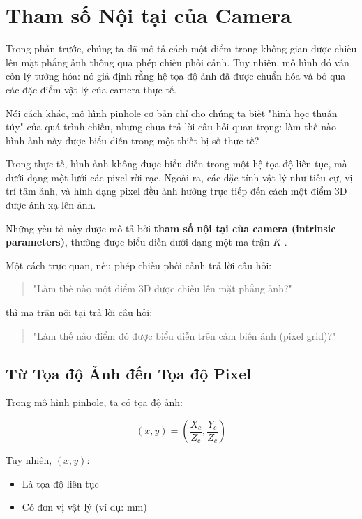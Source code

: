 \section{Tham số Nội tại của Camera}
\label{sec:intrinsic_parameters}

Trong phần trước, chúng ta đã mô tả cách một điểm trong không gian được chiếu lên mặt phẳng ảnh thông qua phép chiếu phối cảnh. Tuy nhiên, mô hình đó vẫn còn lý tưởng hóa: nó giả định rằng hệ tọa độ ảnh đã được chuẩn hóa và bỏ qua các đặc điểm vật lý của camera thực tế.

Nói cách khác, mô hình pinhole cơ bản chỉ cho chúng ta biết "hình học thuần túy" của quá trình chiếu, nhưng chưa trả lời câu hỏi quan trọng: làm thế nào hình ảnh này được biểu diễn trong một thiết bị số thực tế?

Trong thực tế, hình ảnh không được biểu diễn trong một hệ tọa độ liên tục, mà dưới dạng một lưới các pixel rời rạc. Ngoài ra, các đặc tính vật lý như tiêu cự, vị trí tâm ảnh, và hình dạng pixel đều ảnh hưởng trực tiếp đến cách một điểm 3D được ánh xạ lên ảnh.

Những yếu tố này được mô tả bởi \textbf{tham số nội tại của camera (intrinsic parameters)}, thường được biểu diễn dưới dạng một ma trận $K$ \cite{Hartley2003, Szeliski2010}.

Một cách trực quan, nếu phép chiếu phối cảnh trả lời câu hỏi:
\begin{quote}
	"Làm thế nào một điểm 3D được chiếu lên mặt phẳng ảnh?"
\end{quote}

thì ma trận nội tại trả lời câu hỏi:
\begin{quote}
	"Làm thế nào điểm đó được biểu diễn trên cảm biến ảnh (pixel grid)?"
\end{quote}

\subsection{Từ Tọa độ Ảnh đến Tọa độ Pixel}
\label{subsec:image_to_pixel}

Trong mô hình pinhole, ta có tọa độ ảnh:

\[
(x, y) = \left(\frac{X_c}{Z_c}, \frac{Y_c}{Z_c}\right)
\]

Tuy nhiên, $(x, y)$:
\begin{itemize}
	\item Là tọa độ liên tục
	\item Có đơn vị vật lý (ví dụ: mm)
\end{itemize}

